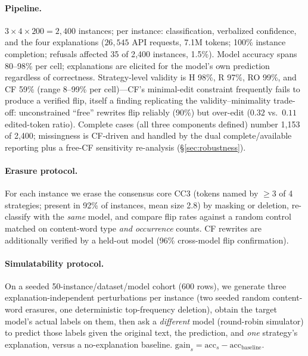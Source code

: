 \documentclass[11pt]{article}
\begin{document}
\paragraph{Pipeline.} $3\times4\times200=2{,}400$ instances; per instance: classification, verbalized confidence, and the four explanations ($26{,}545$ API requests, 7.1M tokens; 100\% instance completion; refusals affected 35 of 2{,}400 instances, 1.5\%). Model accuracy spans 80--98\% per cell; explanations are elicited for the model's own prediction regardless of correctness. Strategy-level validity is H 98\%, R 97\%, RO 99\%, and CF 59\% (range 8--99\% per cell)---CF's minimal-edit constraint frequently fails to produce a verified flip, itself a finding replicating the validity--minimality trade-off: unconstrained ``free'' rewrites flip reliably (90\%) but over-edit ($0.32$ vs.\ $0.11$ edited-token ratio). Complete cases (all three components defined) number 1{,}153 of 2{,}400; missingness is CF-driven and handled by the dual complete/available reporting plus a free-CF sensitivity re-analysis (\S\ref{sec:robustness}).

\paragraph{Erasure protocol.} For each instance we erase the consensus core CC3 (tokens named by $\ge$3 of 4 strategies; present in 92\% of instances, mean size 2.8) by masking or deletion, re-classify with the \emph{same} model, and compare flip rates against a random control matched on content-word type \emph{and occurrence} counts. CF rewrites are additionally verified by a held-out model (96\% cross-model flip confirmation).

\paragraph{Simulatability protocol.} On a seeded 50-instance/dataset/model cohort (600 rows), we generate three explanation-independent perturbations per instance (two seeded random content-word erasures, one deterministic top-frequency deletion), obtain the target model's actual labels on them, then ask a \emph{different} model (round-robin simulator) to predict those labels given the original text, the prediction, and \emph{one} strategy's explanation, versus a no-explanation baseline. $\mathrm{gain}_s=\mathrm{acc}_s-\mathrm{acc}_{\text{baseline}}$.
\end{document}
